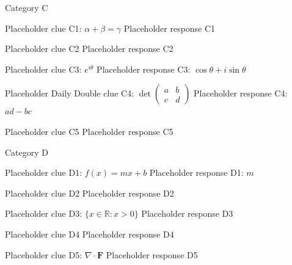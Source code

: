 \documentclass{article}
\begin{document}
\begin{category}{Category C}
  \begin{clue}
    Placeholder clue C1: $\alpha + \beta = \gamma$
  \response
    Placeholder response C1
  \end{clue}
  \begin{clue}
    Placeholder clue C2
  \response
    Placeholder response C2
  \end{clue}
  \begin{clue}
    Placeholder clue C3: $e^{i\theta}$
  \response
    Placeholder response C3: $\cos\theta + i\sin\theta$
  \end{clue}
  \begin{clue}[dailydouble]
    Placeholder Daily Double clue C4: $\det\begin{pmatrix} a & b \\ c & d \end{pmatrix}$
  \response
    Placeholder response C4: $ad - bc$
  \end{clue}
  \begin{clue}
    Placeholder clue C5
  \response
    Placeholder response C5
  \end{clue}
\end{category}

\begin{category}{Category D}
  \begin{clue}
    Placeholder clue D1: $f(x) = mx + b$
  \response
    Placeholder response D1: $m$
  \end{clue}
  \begin{clue}
    Placeholder clue D2
  \response
    Placeholder response D2
  \end{clue}
  \begin{clue}
    Placeholder clue D3: $\{x \in \mathbb{R} : x > 0\}$
  \response
    Placeholder response D3
  \end{clue}
  \begin{clue}
    Placeholder clue D4
  \response
    Placeholder response D4
  \end{clue}
  \begin{clue}
    Placeholder clue D5: $\nabla \cdot \mathbf{F}$
  \response
    Placeholder response D5
  \end{clue}
\end{category}
\end{document}
